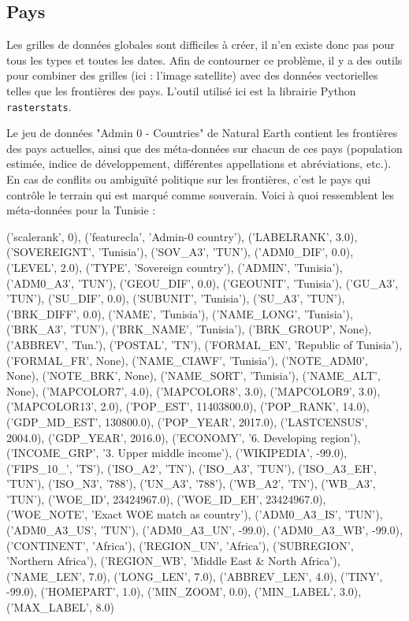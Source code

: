 \documentclass[a4paper, 11pt]{report}
\begin{document}
\subsection{Pays}
Les grilles de données globales sont difficiles à créer, il n'en existe donc pas pour tous les types et toutes les dates. Afin de contourner ce problème, il y a des outils pour combiner des grilles (ici : l'image satellite) avec des données vectorielles telles que les frontières des pays. L'outil utilisé ici est la librairie Python \texttt{rasterstats}.

Le jeu de données "Admin 0 - Countries" de Natural Earth \cite{naturalearthdata} contient les frontières des pays actuelles, ainsi que des méta-données sur chacun de ces pays (population estimée, indice de développement, différentes appellations et abréviations, etc.). En cas de conflits ou ambiguïté politique sur les frontières, c'est le pays qui contrôle le terrain qui est marqué comme souverain. Voici à quoi ressemblent les méta-données pour la Tunisie :\\
\begin{minipage}[t]{1.0\textwidth}
			{('scalerank', 0), ('featurecla', 'Admin-0 country'), ('LABELRANK', 3.0), ('SOVEREIGNT', 'Tunisia'), ('SOV\_A3', 'TUN'), ('ADM0\_DIF', 0.0), ('LEVEL', 2.0), ('TYPE', 'Sovereign country'), ('ADMIN', 'Tunisia'), ('ADM0\_A3', 'TUN'), ('GEOU\_DIF', 0.0), ('GEOUNIT', 'Tunisia'), ('GU\_A3', 'TUN'), ('SU\_DIF', 0.0), ('SUBUNIT', 'Tunisia'), ('SU\_A3', 'TUN'), ('BRK\_DIFF', 0.0), ('NAME', 'Tunisia'), ('NAME\_LONG', 'Tunisia'), ('BRK\_A3', 'TUN'), ('BRK\_NAME', 'Tunisia'), ('BRK\_GROUP', None), ('ABBREV', 'Tun.'), ('POSTAL', 'TN'), ('FORMAL\_EN', 'Republic of Tunisia'), ('FORMAL\_FR', None), ('NAME\_CIAWF', 'Tunisia'), ('NOTE\_ADM0', None), ('NOTE\_BRK', None), ('NAME\_SORT', 'Tunisia'), ('NAME\_ALT', None), ('MAPCOLOR7', 4.0), ('MAPCOLOR8', 3.0), ('MAPCOLOR9', 3.0), ('MAPCOLOR13', 2.0), ('POP\_EST', 11403800.0), ('POP\_RANK', 14.0), ('GDP\_MD\_EST', 130800.0), ('POP\_YEAR', 2017.0), ('LASTCENSUS', 2004.0), ('GDP\_YEAR', 2016.0), ('ECONOMY', '6. Developing region'), ('INCOME\_GRP', '3. Upper middle income'), ('WIKIPEDIA', -99.0), ('FIPS\_10\_', 'TS'), ('ISO\_A2', 'TN'), ('ISO\_A3', 'TUN'), ('ISO\_A3\_EH', 'TUN'), ('ISO\_N3', '788'), ('UN\_A3', '788'), ('WB\_A2', 'TN'), ('WB\_A3', 'TUN'), ('WOE\_ID', 23424967.0), ('WOE\_ID\_EH', 23424967.0), ('WOE\_NOTE', 'Exact WOE match as country'), ('ADM0\_A3\_IS', 'TUN'), ('ADM0\_A3\_US', 'TUN'), ('ADM0\_A3\_UN', -99.0), ('ADM0\_A3\_WB', -99.0),	 ('CONTINENT', 'Africa'), ('REGION\_UN', 'Africa'), ('SUBREGION', 'Northern Africa'), ('REGION\_WB', 'Middle East \& North Africa'), ('NAME\_LEN', 7.0), ('LONG\_LEN', 7.0), ('ABBREV\_LEN', 4.0), ('TINY', -99.0), ('HOMEPART', 1.0), ('MIN\_ZOOM', 0.0), ('MIN\_LABEL', 3.0), ('MAX\_LABEL', 8.0)}
\end{minipage}\\
\end{document}
